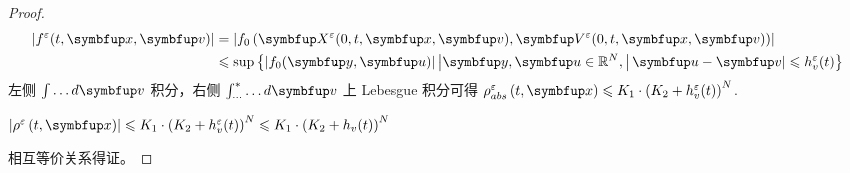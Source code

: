 \begin{proof}
        \[
        \begin{aligned}
        \left|f^{\varepsilon}(t, \vx, \vv)\right| &=\left|f_0\left(\vect{X}^{\varepsilon}(0, t, \vx, \vv), \vect{V}^{\varepsilon}(0, t, \vx, \vv)\right)\right| \\
        & \leqslant \sup \left\{|f_0(\vect{y}, \vect{u})|\left|\vect{y},\vect{u} \in \mathbb{R}^{N},\right| \vect{u}-\vect{v} | \leqslant h_{v}^{\varepsilon}(t)\right\}
        \end{aligned}
        \]
        左侧 $\int \ldots d \vv$ 积分，右侧 $\int_{\cdots}^{*} \ldots d \vv$ 上 Lebesgue 积分可得 $\rho^{\varepsilon}_{abs}\left(t, \vx\right) \leqslant K_{1} \cdot\left(K_{2}+h_{v}^{\varepsilon}(t)\right)^{N}$.
        
        $\left| \rho^{\varepsilon} \left(t, \vx \right)\right| \leqslant K_{1} \cdot\left(K_{2}+h_{v}^{\varepsilon}(t)\right)^{N}\leqslant K_{1} \cdot\left(K_{2}+h_{v}(t)\right)^{N}$

相互等价关系得证。
\end{proof}





